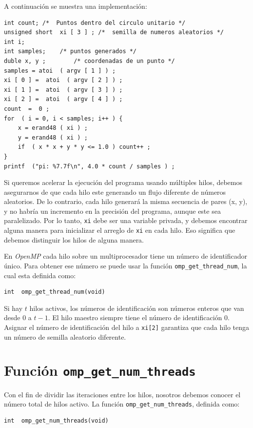 \documentclass[12pt,letterpaper]{book}
\begin{document}
A continuación se muestra una implementación:

\begin{lstlisting}[style=C]
int count; /*  Puntos dentro del circulo unitario */
unsigned short  xi [ 3 ] ; /*  semilla de numeros aleatorios */
int i;		
int samples;	/* puntos generados */
duble x, y ;		/* coordenadas de un punto */
samples = atoi  ( argv [ 1 ] ) ;
xi [ 0 ] =  atoi  ( argv [ 2 ] ) ;
xi [ 1 ] =  atoi  ( argv [ 3 ] ) ;
xi [ 2 ] =  atoi  ( argv [ 4 ] ) ;
count  =  0 ;
for  ( i = 0, i < samples; i++ ) {
	x = erand48 ( xi ) ;
	y = erand48 ( xi ) ;
	if  ( x * x + y * y <= 1.0 ) count++ ;
}
printf  ("pi: %7.7f\n", 4.0 * count / samples ) ;
\end{lstlisting}

Si queremos acelerar la ejecución del programa usando múltiples hilos, debemos asegurarnos de que cada hilo este generando un flujo diferente de números aleatorios. De lo contrario, cada hilo generará la misma secuencia de pares (x, y), y no habría un incremento en la precisión del programa, aunque este sea paralelizado. Por lo tanto, \texttt{xi} debe ser una variable privada, y debemos encontrar alguna manera para inicializar el arreglo de \texttt{xi} en cada hilo. Eso significa que debemos distinguir los hilos de alguna manera.

En \textit{OpenMP} cada hilo sobre un multiprocesador tiene un número de identificador único. Para obtener ese número se puede usar la función \texttt{omp\_get\_thread\_num}, la cual esta definida como:

\begin{lstlisting}[style=C]
int  omp_get_thread_num(void)
\end{lstlisting}

Si hay $t$ hilos activos, los números de identificación son números enteros que van desde $0$ a $t-1$. El hilo maestro siempre tiene el número de identificación $0$.
Asignar el número de identificación del hilo a \texttt{xi[2]} garantiza que cada hilo tenga un número de semilla aleatorio diferente.

\section{Función \texttt{omp\_get\_num\_threads}}
Con el fin de dividir las iteraciones entre los hilos, nosotros debemos conocer el número total de hilos activo. La función \texttt{omp\_get\_num\_threads}, definida como:

\begin{lstlisting}[style=C]
int  omp_get_num_threads(void)
\end{lstlisting}
\end{document}
